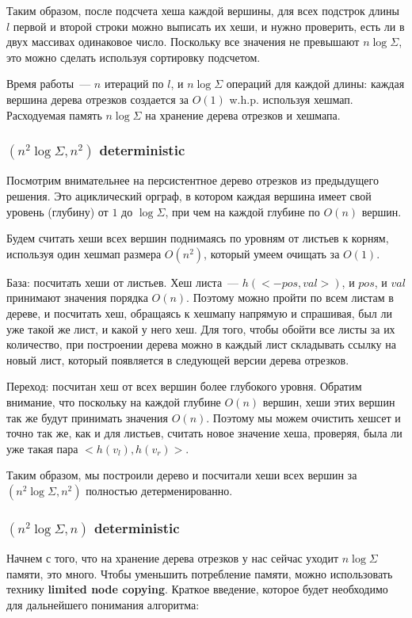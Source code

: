 Таким образом, после подсчета хеша каждой вершины, для всех подстрок длины $l$ первой и второй строки можно выписать их хеши, и нужно проверить, есть ли в двух массивах одинаковое число. Поскольку все значения не превышают $n \log \Sigma$, это можно сделать используя сортировку подсчетом.

Время работы~--- $n$ итераций по $l$, и $n \log \Sigma$ операций для каждой длины: каждая вершина дерева отрезков создается за $O(1)$ w.h.p. используя хешмап. Расходуемая память $n \log \Sigma$ на хранение дерева отрезков и хешмапа.


\subsubsection{$(n^2 \log \Sigma, n^2)$ deterministic}

Посмотрим внимательнее на персистентное дерево отрезков из предыдущего решения. Это ациклический орграф, в котором каждая вершина имеет свой уровень (глубину) от $1$ до $\log \Sigma$, при чем на каждой глубине по $O(n)$ вершин.

Будем считать хеши всех вершин поднимаясь по уровням от листьев к корням, используя один хешмап размера $O(n^2)$, который умеем очищать за $O(1)$.

База: посчитать хеши от листьев. Хеш листа~--- $h(<-pos, val>)$, и $pos$, и $val$ принимают значения порядка $O(n)$. Поэтому можно пройти по всем листам в дереве, и посчитать хеш, обращаясь к хешмапу напрямую и спрашивая, был ли уже такой же лист, и какой у него хеш. Для того, чтобы обойти все листы за их количество, при построении дерева можно в каждый лист складывать ссылку на новый лист, который появляется в следующей версии дерева отрезков.

Переход: посчитан хеш от всех вершин более глубокого уровня. Обратим внимание, что поскольку на каждой глубине $O(n)$ вершин, хеши этих вершин так же будут принимать значения $O(n)$. Поэтому мы можем очистить хешсет и точно так же, как и для листьев, считать новое значение хеша, проверяя, была ли уже такая пара $<h(v_l), h(v_r)>$.

Таким образом, мы построили дерево и посчитали хеши всех вершин за $(n^2 \log \Sigma, n^2)$ полностью детерменированно.


\subsubsection{$(n^2 \log \Sigma, n)$ deterministic}

Начнем с того, что на хранение дерева отрезков у нас сейчас уходит $n \log \Sigma$ памяти, это много. Чтобы уменьшить потребление памяти, можно использовать технику \textbf{limited node copying}. Краткое введение, которое будет необходимо для дальнейшего понимания алгоритма:

